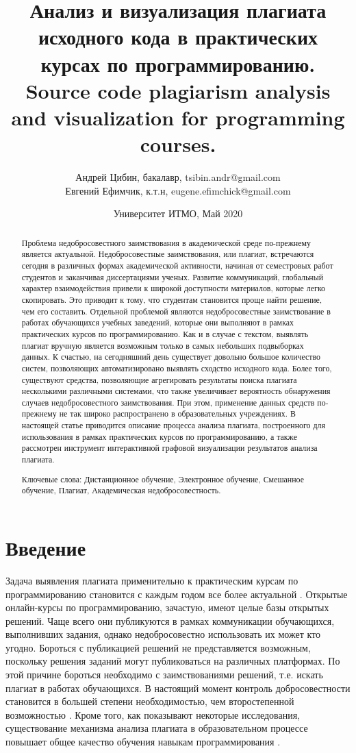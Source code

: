 \documentclass[a4paper,14pt]{extarticle}
\title{Анализ и визуализация плагиата исходного кода в практических курсах по программированию. Source code plagiarism analysis and visualization for programming courses.}
\author{Андрей Цибин, бакалавр, tsibin.andr@gmail.com\\Евгений Ефимчик, к.т.н, eugene.efimchick@gmail.com}
\date{Университет ИТМО, Май 2020}
\begin{document}
\maketitle

\begin{abstract}

Проблема недобросовестного заимствования в академической среде по-прежнему
является актуальной. Недобросовестные заимствования, или плагиат, встречаются сегодня в различных формах академической активности, начиная от семестровых работ студентов и заканчивая диссертациями ученых. Развитие коммуникаций, глобальный характер взаимодействия привели к широкой доступности материалов, которые легко скопировать. Это приводит к тому, что студентам становится проще найти решение, чем его составить. Отдельной проблемой
являются недобросовестные заимствование в работах обучающихся учебных заведений, которые они выполняют в рамках практических курсов по программированию. Как и в случае с текстом, выявлять плагиат вручную является возможным только в самых небольших подвыборках данных. К счастью, на сегодняшний день существует довольно большое количество систем, позволяющих
автоматизировано выявлять сходство исходного кода. Более того, существуют
средства, позволяющие агрегировать результаты поиска плагиата несколькими
различными системами, что также увеличивает вероятность обнаружения случаев недобросовестного заимствования. При этом, применение данных средств
по-прежнему не так широко распространено в образовательных учреждениях.
В настоящей статье приводится описание процесса анализа плагиата, построенного для использования в рамках практических курсов по программированию, а также рассмотрен инструмент интерактивной графовой визуализации результатов анализа плагиата.

Ключевые слова: Дистанционное обучение, Электронное обучение, Смешанное обучение, Плагиат, Академическая недобросовестность.

\end{abstract}

\section{Введение}

Задача выявления плагиата применительно к практическим курсам по программированию становится с каждым годом все более актуальной \citep{plagiarismEpidemic}. Открытые онлайн-курсы по программированию, зачастую, имеют целые базы открытых решений. Чаще всего они публикуются в рамках коммуникации обучающихся,  выполнивших задания, однако недобросовестно использовать их может кто угодно. Бороться с публикацией решений не представляется возможным, поскольку решения заданий могут публиковаться на различных платформах. По этой причине бороться необходимо с заимствованиями решений, т.е. искать плагиат в работах обучающихся. В настоящий момент контроль добросовестности становится в большей степени необходимостью, чем второстепенной возможностью \citep{sciencePlagiarismPaper}. Кроме того, как показывают некоторые исследования, существование механизма анализа плагиата в образовательном процессе повышает общее качество обучения навыкам программирования \citep{plagCheckEffect}\citep{plagInterventionEffect}.
\end{document}
